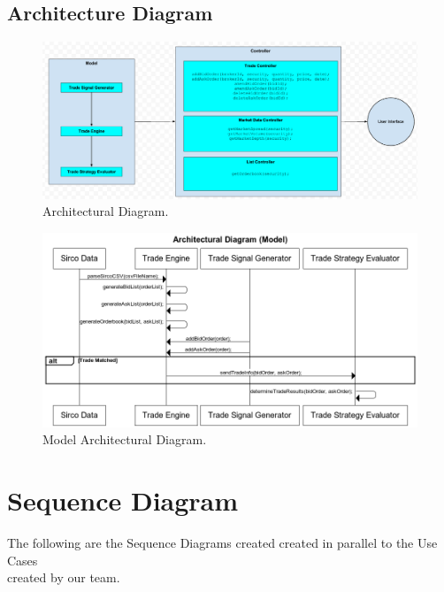 \documentclass[a4paper]{article}
\begin{document}
\begin {landscape}
\section {Architecture Diagram}
\begin{figure}[H]
  \centering
    \includegraphics[width=1.6\textwidth]{images/ADiagram}
     \caption{Architectural Diagram.}
\end{figure}
\end {landscape}

\begin{landscape}
\begin{figure}
  
  \centering
    \includegraphics[width=1.6\textwidth]{images/aSequenceDiagram}
    \caption{Model Architectural Diagram.}
\end{figure}
\end {landscape}


\section {Sequence Diagram} 

The following are the Sequence Diagrams created created in parallel to the Use Cases \\
created by our team. \\
\end{document}
